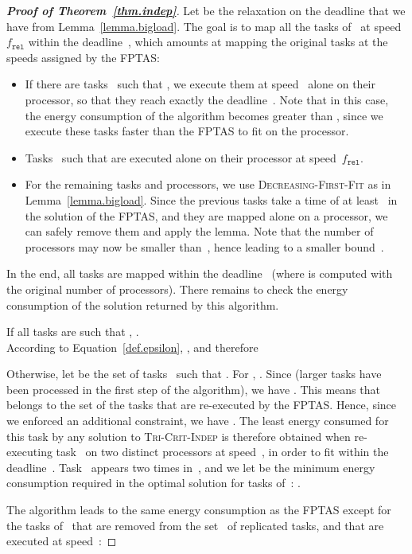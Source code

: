 \documentclass[a4paper]{article}
\theoremstyle{plain}
\theoremstyle{definition}
\theoremstyle{remark}
\newcommand{\fr}{\ensuremath{f_{\texttt{rel}}}\xspace}
\newcommand{\dff}{\textsc{Dec\-reasing-First-Fit}\xspace}
\newcommand{\indep}{\textsc{Tri-Crit-In\-dep}\xspace}
\begin{document}
\begin{proof}[{\bf Proof of Theorem~\ref{thm.indep}}]
Let  be the
relaxation on the deadline that we have from
Lemma~\ref{lemma.bigload}. The goal is to map all the tasks
of~ at speed~\fr within the deadline~, which
amounts at mapping the original tasks at the speeds assigned by the
FPTAS: \begin{itemize}
\item If there are tasks~ such that , we execute them at speed~ alone
on their processor, so that they reach exactly the deadline~. Note that in this case, the energy consumption of the algorithm
becomes greater than , since we execute these tasks
faster than the FPTAS to fit on the processor. 
\item Tasks~ such that  are executed alone on their processor at speed~\fr. 
\item For the remaining tasks and processors, we use \dff as in
  Lemma~\ref{lemma.bigload}. Since the previous tasks take a time of
  at least~ in the solution of the FPTAS, and they are mapped alone
  on a processor, we can safely remove them and apply the lemma. Note
  that the number of processors may now be smaller than~, hence
  leading to a smaller bound~.
\end{itemize}





In the end, all tasks are mapped within the deadline~ (where
 is computed with the original number of processors). There
remains to check the energy consumption of the solution returned by
this algorithm. 

\medskip
If all tasks are such that , 
. \\
According to Equation~\eqref{def.epsilon}, , and therefore 




\medskip
Otherwise, let  be the set of tasks~ such that
. For ,  . Since  (larger tasks have been
processed in the first step of the algorithm), we have
.  This means that  belongs to the set of
the tasks that are re-executed by the FPTAS.  Hence, since we enforced
an additional constraint, we have . The
least energy consumed for this task by any solution to \indep is
therefore obtained when re-execu\-ting task~ on two distinct
processors at speed~, in order to fit within the
deadline~. Task~ appears two times in~, and we let
 be the minimum energy consumption required in the optimal
solution for tasks of~:
.

\smallskip 
The algorithm leads to the same energy consumption as the FPTAS except
for the tasks of~ that are removed from the set~ of
replicated tasks, and that are executed at speed~:
 

\end{proof}
\end{document}
